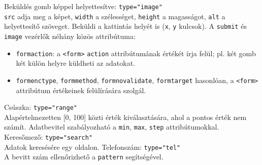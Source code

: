 \begin{frame}
  Beküldés gomb képpel helyettesítve: \texttt{type="image"}\\
  \texttt{src}  adja meg a képet, \texttt{width} a szélességet, 
  \texttt{height} a magasságot, \texttt{alt} a helyettesítő 
  szöveget. Beküldi a kattintás helyét is (\texttt{x}, \texttt{y} 
  kulcsok).
  \vfill
  A \texttt{submit} és \texttt{image} vezérlők néhány közös 
  attribútuma:
  \begin{itemize}
    \item \texttt{formaction}: a \texttt{<form>} \texttt{action} 
    attribútumának értékét írja felül; pl. két gomb két 
    külön helyre küldheti az adatokat.
    \item \texttt{formenctype}, \texttt{formmethod}, 
    \texttt{formnovalidate}, \texttt{formtarget} hasonlóan, a 
    \texttt{<form>} attribútum értékeinek felülírására szolgál.
  \end{itemize}
\end{frame}

\begin{frame}
  Csúszka: \texttt{type="range"}\\
  Alapértelmezetten [0, 100] közti érték kiválasztására, ahol a 
  pontos érték nem számít. Adatbevitel szabályozható a 
  \texttt{min}, \texttt{max}, \texttt{step} attribútumokkal.
  \vfill
  Keresőmező: \texttt{type="search"}\\
  Adatok keresésére egy oldalon.
  \vfill
  Telefonszám: \texttt{type="tel"}\\
  A bevitt szám ellenőrizhető a \texttt{pattern} segítségével.
  \vfill
\end{frame}

